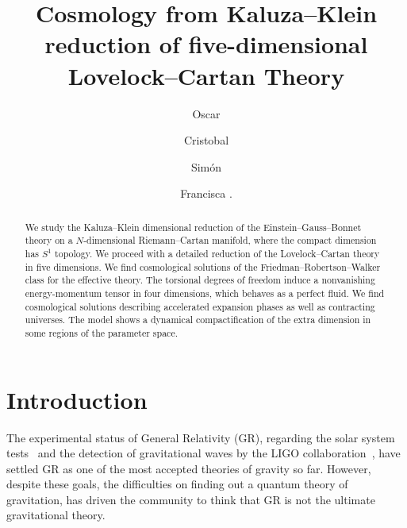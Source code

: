 \documentclass[aps,prd,12pt,superscriptaddress,showpacs,showkeys,longbibliography,reprint,nofootinbib]{revtex4-1}
\begin{document}
\title{Cosmology from  Kaluza--Klein reduction of five-dimensional Lovelock--Cartan Theory}

\author{Oscar }

\author{Cristobal }

\author{Sim\'on }

\author{Francisca .}

\begin{abstract}
  We study the Kaluza--Klein dimensional reduction of the Einstein--Gauss--Bonnet theory on a $N$-dimensional Riemann--Cartan manifold, where the compact dimension has $S^1$ topology. We proceed with a detailed reduction of the Lovelock--Cartan theory in five dimensions. We find cosmological solutions of the Friedman--Robertson--Walker class for the effective theory.
  The torsional degrees of freedom induce a nonvanishing energy-momentum tensor in four dimensions, which behaves as a perfect fluid. We find cosmological solutions describing accelerated expansion phases as well as contracting universes. The model shows a dynamical compactification of the extra dimension in some regions of the parameter space. 
\end{abstract}



\maketitle

\section{Introduction}

The experimental status of General Relativity (GR), regarding the solar system tests~\cite{Will:2014kxa} and the detection of gravitational waves by the LIGO collaboration~\cite{Abbott:2016blz}, have settled GR as one of the most accepted theories of gravity so far. However, despite these goals, the difficulties on finding out a quantum theory of gravitation, has driven the community to think that GR is not the ultimate gravitational theory. 
\end{document}
